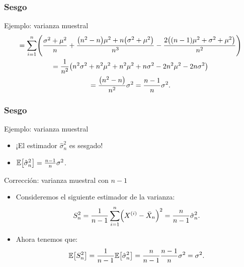 \documentclass[table]{beamer}
\begin{document}
\begin{frame}
    \frametitle{Sesgo}
    \begin{block}{Ejemplo: varianza muestral}
        \begin{multline*}
            = \sum_{i = 1}^{n} \parens{\frac{\sigma^{2} + \mu^{2}}{n} + \frac{\parens{n^{2} - n} \mu^{2} + n \parens{\sigma^{2} + \mu^{2}}}{n^{3}} - \frac{2 \parens{\parens{n - 1} \mu^{2} + \sigma^{2} + \mu^{2}}}{n^{2}}}
            \\
            = \frac{1}{n^{2}} \parens{n^{2} \sigma^{2} + n^{2} \mu^{2} + n^{2} \mu^{2} + n \sigma^{2} - 2 n^{2} \mu^{2} - 2 n \sigma^{2}}
            \\
            = \frac{\parens{n^{2} - n}}{n^{2}} \sigma^{2} = \frac{n - 1}{n} \sigma^{2} .
        \end{multline*}
    \end{block}
\end{frame}

\begin{frame}
    \frametitle{Sesgo}
    \begin{block}{Ejemplo: varianza muestral}
        \begin{itemize}
            \item ¡El estimador $\hat{\sigma}^{2}_{n}$ es sesgado!
            \item $\expected{\hat{\sigma}^{2}_{n}} = \frac{n - 1}{n} \sigma^{2}$.
        \end{itemize}
    \end{block}
    \begin{block}{Corrección: varianza muestral con $n - 1$}
        \begin{itemize}
            \item Consideremos el siguiente estimador de la varianza:
                \begin{equation*}
                    S^{2}_{n} = \frac{1}{n - 1} \sum_{i = 1}^{n} \parens{X^{\parens{i}} - \bar{X}_{n}}^{2}
                    = \frac{n}{n - 1} \hat{\sigma}^{2}_{n} .
                \end{equation*}
            \item Ahora tenemos que:
                \begin{equation*}
                    \expected{S^{2}_{n}} = \frac{1}{n - 1} \expected{\hat{\sigma}^{2}_{n}}
                    = \frac{n}{n - 1} \frac{n - 1}{n} \sigma^{2}
                    = \sigma^{2} .
                \end{equation*}
        \end{itemize}
    \end{block}
\end{frame}
\end{document}

